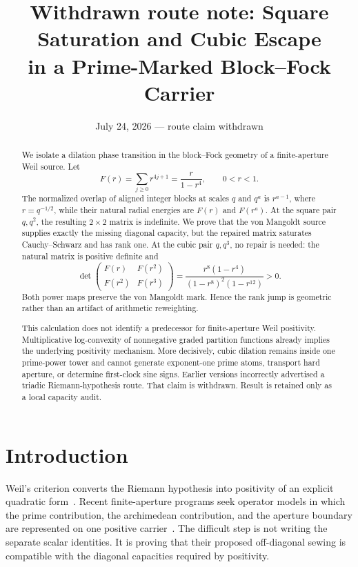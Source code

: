 \documentclass[11pt]{article}
\title{Withdrawn route note: Square Saturation and Cubic Escape\\
in a Prime-Marked Block--Fock Carrier}
\author{}
\date{July 24, 2026 --- route claim withdrawn}
\theoremstyle{definition}
\theoremstyle{remark}
\begin{document}
\maketitle

\begin{abstract}
We isolate a dilation phase transition in the block--Fock geometry of a finite-aperture
Weil source.  Let
\[
 F(r)=\sum_{j\geq0}r^{4j+1}=\frac{r}{1-r^4},
 \qquad 0<r<1.
\]
The normalized overlap of aligned integer blocks at scales $q$ and $q^a$ is $r^{a-1}$,
where $r=q^{-1/2}$, while their natural radial energies are $F(r)$ and $F(r^a)$.
At the square pair $q,q^2$, the resulting $2\times2$ matrix is indefinite.  We prove
that the von Mangoldt source supplies exactly the missing diagonal capacity, but the repaired
matrix saturates Cauchy--Schwarz and has rank one.  At the cubic pair $q,q^3$, no repair is
needed: the natural matrix is positive definite and
\[
 \det
 \begin{pmatrix}
 F(r)&F(r^2)\\ F(r^2)&F(r^3)
 \end{pmatrix}
 =
 \frac{r^8(1-r^4)}{(1-r^8)^2(1-r^{12})}>0.
\]
Both power maps preserve the von Mangoldt mark.  Hence the rank jump is geometric rather than
an artifact of arithmetic reweighting.

This calculation does not identify a predecessor for finite-aperture Weil positivity.
Multiplicative log-convexity of nonnegative graded partition functions already implies the
underlying positivity mechanism. More decisively, cubic dilation remains inside one prime-power
tower and cannot generate exponent-one prime atoms, transport hard aperture, or determine
first-clock sine signs. Earlier versions incorrectly advertised a triadic Riemann-hypothesis
route. That claim is withdrawn. Result is retained only as a local capacity audit.
\end{abstract}

\section{Introduction}

Weil's criterion converts the Riemann hypothesis into positivity of an explicit quadratic
form~\cite{Weil1952,ConnesConsani2020,Suzuki2026}.  Recent finite-aperture programs seek operator
models in which the prime contribution, the archimedean contribution, and the aperture boundary
are represented on one positive carrier~\cite{CCM2025,ConnesVanSuijlekom2025}.  The difficult
step is not writing the separate scalar identities.  It is proving that their proposed
off-diagonal sewing is compatible with the diagonal capacities required by positivity.
\end{document}

